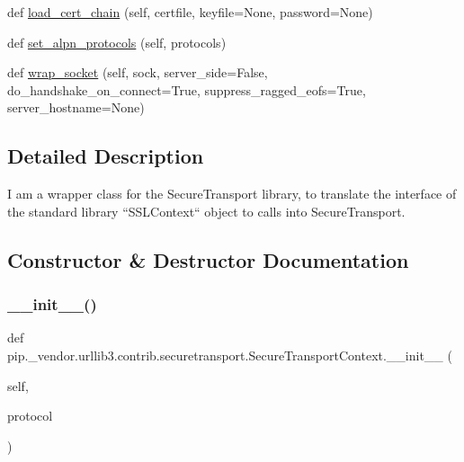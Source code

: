 \begin{DoxyCompactItemize}
\item 
def \hyperlink{classpip_1_1__vendor_1_1urllib3_1_1contrib_1_1securetransport_1_1SecureTransportContext_afe0f59937cdacfddd9ac8f11580dcd84}{load\+\_\+cert\+\_\+chain} (self, certfile, keyfile=None, password=None)
\item 
def \hyperlink{classpip_1_1__vendor_1_1urllib3_1_1contrib_1_1securetransport_1_1SecureTransportContext_ae53669fdf254cec0a10953bb20f6d559}{set\+\_\+alpn\+\_\+protocols} (self, protocols)
\item 
def \hyperlink{classpip_1_1__vendor_1_1urllib3_1_1contrib_1_1securetransport_1_1SecureTransportContext_a0d4b10fc19b24ab873ace5e8804a5729}{wrap\+\_\+socket} (self, sock, server\+\_\+side=False, do\+\_\+handshake\+\_\+on\+\_\+connect=True, suppress\+\_\+ragged\+\_\+eofs=True, server\+\_\+hostname=None)
\end{DoxyCompactItemize}


\subsection{Detailed Description}
\begin{DoxyVerb}I am a wrapper class for the SecureTransport library, to translate the
interface of the standard library ``SSLContext`` object to calls into
SecureTransport.
\end{DoxyVerb}
 

\subsection{Constructor \& Destructor Documentation}
\mbox{\label{classpip_1_1__vendor_1_1urllib3_1_1contrib_1_1securetransport_1_1SecureTransportContext_a9c0772fa48e57acc6850cab82aebda5b}} 
\subsubsection{\texorpdfstring{\+\_\+\+\_\+init\+\_\+\+\_\+()}{\_\_init\_\_()}}
{\footnotesize\ttfamily def pip.\+\_\+vendor.\+urllib3.\+contrib.\+securetransport.\+Secure\+Transport\+Context.\+\_\+\+\_\+init\+\_\+\+\_\+ (\begin{DoxyParamCaption}\item[{}]{self,  }\item[{}]{protocol }\end{DoxyParamCaption})}



